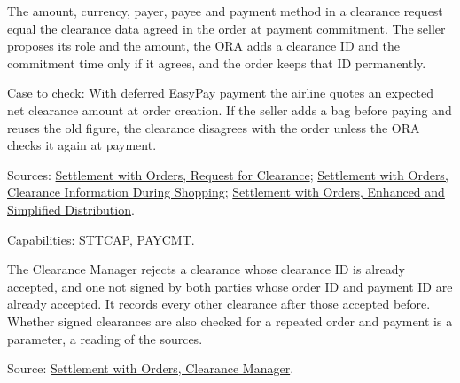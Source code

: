 \begin{theorem}
  \label{thm:accounting-clearance-matches-order}
  The amount, currency, payer, payee and payment method in a clearance
  request equal the clearance data agreed in the order at payment
  commitment. The seller proposes its role and the amount, the ORA adds a
  clearance ID and the commitment time only if it agrees, and the order
  keeps that ID permanently.

  Case to check: With deferred EasyPay payment the airline quotes an
  expected net clearance amount at order creation. If the seller adds a bag
  before paying and reuses the old figure, the clearance disagrees with the
  order unless the ORA checks it again at payment.

  Sources: \href{https://standards.atlassian.net/wiki/spaces/SWO/pages/574259760}{Settlement with Orders, Request for Clearance};
  \href{https://standards.atlassian.net/wiki/spaces/SWO/pages/574881945}{Settlement with Orders, Clearance Information During Shopping};
  \href{https://standards.atlassian.net/wiki/spaces/SWO/pages/574653091}{Settlement with Orders, Enhanced and Simplified Distribution}.

  Capabilities: STTCAP, PAYCMT.
\end{theorem}

\begin{definition}
  \label{def:accounting-accepting-clearance}
  The Clearance Manager rejects a clearance whose clearance ID is already
  accepted, and one not signed by both parties whose order ID and payment
  ID are already accepted.  It records every other clearance after those
  accepted before.  Whether signed clearances are also checked for a
  repeated order and payment is a parameter, a reading of the sources.

  Source: \href{https://standards.atlassian.net/wiki/spaces/SWO/pages/574259794}{Settlement with Orders, Clearance Manager}.
\end{definition}

